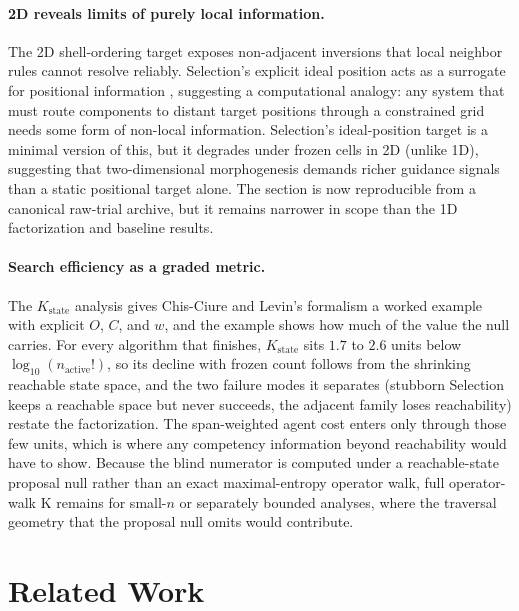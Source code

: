 \documentclass[11pt]{article}
\begin{document}
\paragraph{2D reveals limits of purely local information.}
The 2D shell-ordering target exposes non-adjacent inversions that local neighbor rules cannot resolve
reliably. Selection's explicit ideal position acts as a surrogate for positional information
\cite{wolpert1969positional}, suggesting a computational analogy: any system that must route
components to distant target positions through a constrained grid needs some form of non-local
information. Selection's ideal-position target is a minimal version of this, but it degrades under
frozen cells in 2D (unlike 1D), suggesting that two-dimensional morphogenesis demands richer
guidance signals than a static positional target alone. The section is now reproducible from a
canonical raw-trial archive, but it remains narrower in scope than the 1D factorization and
baseline results.

\paragraph{Search efficiency as a graded metric.}
The $K_{\mathrm{state}}$ analysis gives Chis-Ciure and Levin's formalism \cite{chisciure2025cognition}
a worked example with explicit $O$, $C$, and $w$, and the example shows how much of the value the
null carries. For every algorithm that finishes, $K_{\mathrm{state}}$ sits $1.7$ to $2.6$ units
below $\log_{10}(n_{\text{active}}!)$, so its decline with frozen count follows from the shrinking
reachable state space, and the two failure modes it separates (stubborn Selection keeps a reachable
space but never succeeds, the adjacent family loses reachability) restate the factorization. The
span-weighted agent cost enters only through those few units, which is where any
competency information beyond reachability would have to show. Because the blind numerator is
computed under a reachable-state proposal null rather than an exact maximal-entropy operator walk,
full operator-walk K remains for small-$n$ or separately bounded analyses, where the traversal
geometry that the proposal null omits would contribute.

\section{Related Work}
\label{sec:related}
\end{document}
